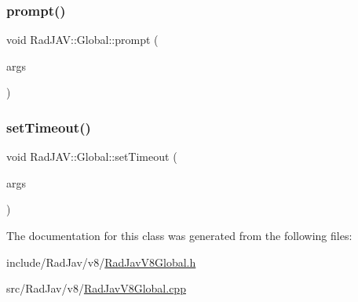 \mbox{\label{class_rad_j_a_v_1_1_global_aeea7c6494e4f941cd6e7d29773ade6d0}} 
\subsubsection{\texorpdfstring{prompt()}{prompt()}}
{\footnotesize\ttfamily void Rad\+J\+A\+V\+::\+Global\+::prompt (\begin{DoxyParamCaption}\item[{const v8\+::\+Function\+Callback\+Info$<$ v8\+::\+Value $>$ \&}]{args }\end{DoxyParamCaption})\hspace{0.3cm}{\ttfamily [static]}}

\mbox{\label{class_rad_j_a_v_1_1_global_a04e02467b0d015ebefab82ecec99371a}} 
\subsubsection{\texorpdfstring{set\+Timeout()}{setTimeout()}}
{\footnotesize\ttfamily void Rad\+J\+A\+V\+::\+Global\+::set\+Timeout (\begin{DoxyParamCaption}\item[{const v8\+::\+Function\+Callback\+Info$<$ v8\+::\+Value $>$ \&}]{args }\end{DoxyParamCaption})\hspace{0.3cm}{\ttfamily [static]}}



The documentation for this class was generated from the following files\+:\begin{DoxyCompactItemize}
\item 
include/\+Rad\+Jav/v8/\mbox{\hyperlink{_rad_jav_v8_global_8h}{Rad\+Jav\+V8\+Global.\+h}}\item 
src/\+Rad\+Jav/v8/\mbox{\hyperlink{_rad_jav_v8_global_8cpp}{Rad\+Jav\+V8\+Global.\+cpp}}\end{DoxyCompactItemize}
